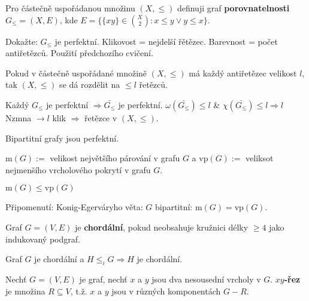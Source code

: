 \begin{definice}
	Pro částečně uspořádanou množinu $(X,\leq)$ definuji graf \textbf{porovnatelnosti} $G_{\leq} = (X,E)$, kde $E = \{\{xy\} \in \binom{X}{2}: x \leq y \lor y \leq x\}$.
\end{definice}

\begin{cvic}
	Dokažte: $G_{\leq}$ je perfektní. Klikovost = nejdelší řětězec. Barevnost = počet antiřetězců. Použití předchozího cvičení.
\end{cvic}

\begin{veta}[Dilworth]
	Pokud v částečně uspořádané množině $(X,\leq)$ má každý antiřetězec velikost $l$, tak $(X, \leq)$ se dá rozdělit na $\leq l$ řetězců.
\end{veta}

\begin{dukaz}
	Každý $G_{\leq}$ je perfektní $\Rightarrow \bar{G_{\leq}}$ je perfektní. $\omega(\bar{G_{\leq}}) \leq l$ \& $\chi(\bar{G_{\leq}}) \leq l \Rightarrow l$ Nzmna $\to l$ klik $\Rightarrow$ řetězce v $(X, \leq)$.
\end{dukaz}

\begin{pozor}
	Bipartitní grafy jsou perfektní.
\end{pozor}

\begin{definice}[Značení]
	$\text{m}(G):=$ velikost největšího párování v grafu $G$ a $\text{vp}(G):=$ veliksot nejmenšího vrcholového pokrytí v grafu $G$.
\end{definice}

\begin{pozor}
	$\text{m}(G) \leq \text{vp}(G)$
\end{pozor}

Připomenutí: Konig-Egerváryho věta: $G$ bipartitní: $\text{m}(G) = \text{vp}(G)$.

\begin{definice}
	Graf $G = (V,E)$ je \textbf{chordální}, pokud neobsahuje kružnici délky $\geq 4$ jako indukovaný podgraf.
\end{definice}

\begin{pozor}
	Graf $G$ je chordální a $H \leq_{i} G \Rightarrow H$ je chordální.
\end{pozor}

\begin{definice}
	Nechť $G = (V,E)$ je graf, nechť $x$ a $y$ jsou dva nesousední vrcholy v $G$. \textbf{$xy$-řez} je množina $R \subseteq V$, t.ž. $x$ a $y$ jsou v různých komponentách $G-R$.
\end{definice}

